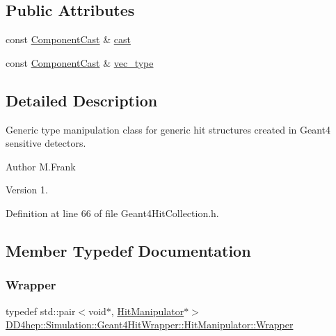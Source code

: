 \subsection*{Public Attributes}
\begin{DoxyCompactItemize}
\item 
const \hyperlink{class_d_d4hep_1_1_component_cast}{Component\+Cast} \& \hyperlink{class_d_d4hep_1_1_simulation_1_1_geant4_hit_wrapper_1_1_hit_manipulator_a81d93c2f45fdb16c6b590401236f1ed5}{cast}
\item 
const \hyperlink{class_d_d4hep_1_1_component_cast}{Component\+Cast} \& \hyperlink{class_d_d4hep_1_1_simulation_1_1_geant4_hit_wrapper_1_1_hit_manipulator_abe16127974bebf369e7719b4e72c0647}{vec\+\_\+type}
\end{DoxyCompactItemize}


\subsection{Detailed Description}
Generic type manipulation class for generic hit structures created in Geant4 sensitive detectors. 

\begin{DoxyAuthor}{Author}
M.\+Frank 
\end{DoxyAuthor}
\begin{DoxyVersion}{Version}
1. 
\end{DoxyVersion}


Definition at line 66 of file Geant4\+Hit\+Collection.\+h.



\subsection{Member Typedef Documentation}
\hypertarget{class_d_d4hep_1_1_simulation_1_1_geant4_hit_wrapper_1_1_hit_manipulator_a4bb62cc7e4979a8d0aea281477a4e38e}{}\label{class_d_d4hep_1_1_simulation_1_1_geant4_hit_wrapper_1_1_hit_manipulator_a4bb62cc7e4979a8d0aea281477a4e38e} 
\subsubsection{\texorpdfstring{Wrapper}{Wrapper}}
{\footnotesize\ttfamily typedef std\+::pair$<$void$\ast$, \hyperlink{class_d_d4hep_1_1_simulation_1_1_geant4_hit_wrapper_1_1_hit_manipulator}{Hit\+Manipulator}$\ast$$>$ \hyperlink{class_d_d4hep_1_1_simulation_1_1_geant4_hit_wrapper_1_1_hit_manipulator_a4bb62cc7e4979a8d0aea281477a4e38e}{D\+D4hep\+::\+Simulation\+::\+Geant4\+Hit\+Wrapper\+::\+Hit\+Manipulator\+::\+Wrapper}}



